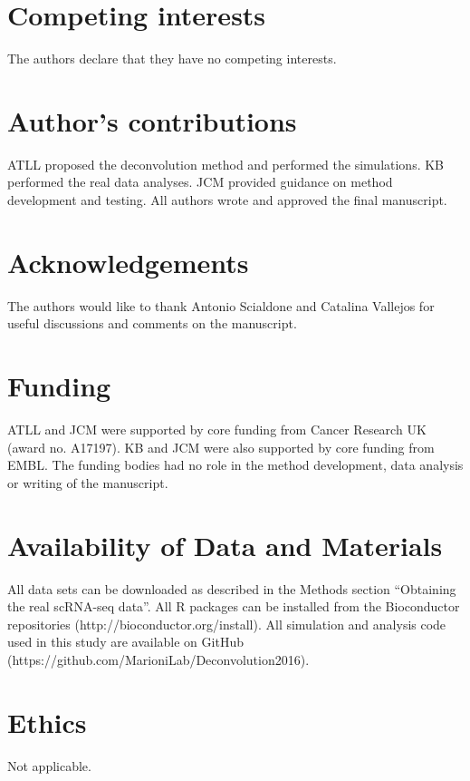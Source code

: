 \documentclass{bmcart}
\newcommand{\revised}[1]{#1}
\begin{document}
\begin{backmatter}

\section*{Competing interests}
The authors declare that they have no competing interests.

\section*{Author's contributions}
ATLL proposed the deconvolution method and performed the simulations.
KB performed the real data analyses.
JCM provided guidance on method development and testing.
All authors wrote and approved the final manuscript.

\section*{Acknowledgements}
The authors would like to thank Antonio Scialdone and Catalina Vallejos for useful discussions and comments on the manuscript.

\section*{Funding}
ATLL and JCM were supported by core funding from Cancer Research UK (award no. A17197).
KB and JCM were also supported by core funding from EMBL.
The funding bodies had no role in the method development, data analysis or writing of the manuscript.

\section*{Availability of Data and Materials}
\revised{All data sets can be downloaded as described in the Methods section ``Obtaining the real scRNA-seq data''.
All R packages can be installed from the Bioconductor repositories (http://bioconductor.org/install).
All simulation and analysis code used in this study are available on GitHub ({https://github.com/MarioniLab/Deconvolution2016}).}

\section*{Ethics}
Not applicable.


\end{backmatter}
\end{document}
